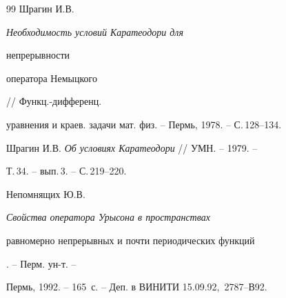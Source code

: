 \begin{thebibliography}{99}
Шрагин И.В. {\em Необходимость условий Каратеодори для


непрерывности


оператора Немыцкого} // Функц.-дифференц.


уравнения и краев. задачи мат. физ. -- Пермь, 1978. -- С.\,128--134.







Шрагин И.В. {\em Об условиях Каратеодори} // УМН. -- 1979. --


Т.\,34. -- вып.\,3. -- С.\,219--220.







Непомнящих Ю.В. {\em Свойства оператора Урысона в пространствах


равномерно непрерывных и почти периодических функций}. -- Перм. ун-т. --


Пермь, 1992. -- 165~с. -- Деп. в ВИНИТИ 15.09.92, \No\,2787--В92.





\end{thebibliography} 


 


\vskip 2cm 


 






 








 


